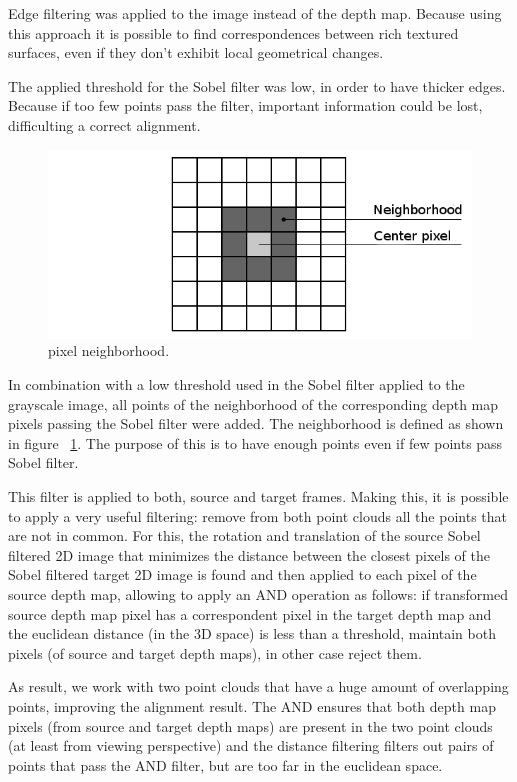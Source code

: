 Edge filtering was applied
to the image instead of the depth map. Because using this approach it is possible to find correspondences between rich textured 
surfaces, even if they don't exhibit local geometrical changes.

The applied threshold for the Sobel filter was low, in order to have thicker edges. Because if too few points pass the filter, important information 
could be lost, difficulting a correct alignment.


\begin{figure}
\begin{center}
\includegraphics[scale=0.4]{images/vecindario}
\end{center}
\caption{pixel neighborhood.}
\label{fig:neighbor}
\end{figure}

In combination with a low threshold used in the Sobel filter applied to the grayscale image, all points of the neighborhood of the corresponding depth map pixels passing the Sobel filter were added. 
The neighborhood is defined as shown in figure ~\ref{fig:neighbor}. The purpose of this is to have enough points even if few points
 pass Sobel filter.

This filter is applied to both, source and target frames. Making this, it is possible to apply a very useful filtering: remove 
from both point clouds all the points that are not in common. For this, the rotation and translation 
of the source Sobel filtered 2D image that minimizes the distance between the closest pixels of the Sobel filtered target 2D image is found and 
then applied to each pixel of the source depth map, 
allowing to apply an AND operation as follows: if transformed source depth map pixel has a correspondent pixel in the target depth map and 
the euclidean distance (in the 3D space) is less than a threshold, maintain both pixels (of source and target depth maps), in other case reject them. 

 As result, we work with two point clouds that have a huge amount of overlapping points, improving the alignment 
result. The AND ensures that both depth map pixels (from source and target depth maps) are present in the two point clouds (at least from viewing 
perspective) and the distance filtering filters out pairs of points that pass the AND filter, but are too far in the euclidean space.

